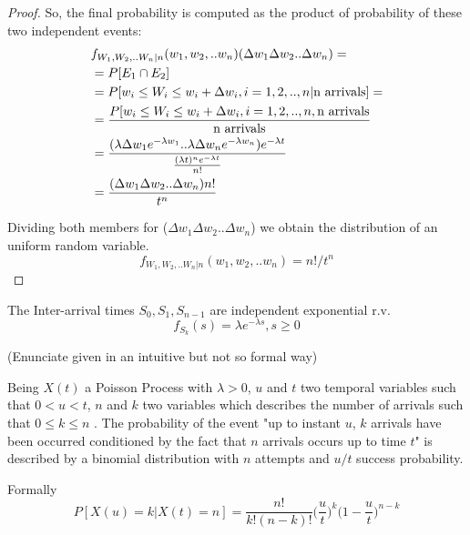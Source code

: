 \begin{theorem}
\begin{proof}
		So, the final probability is computed as the product of probability of these two independent events:
		\begin{equation}
			\begin{split}
				& f_{W_1,W_2,..W_n|n} (w_1,w_2,..w_n)( \Delta w_1\Delta w_2..\Delta w_n) = \\
				& =P[E_1 \cap E_2 ]\\
				& =P[w_i\leq W_i \leq w_i+\Delta w_i, i=1,2,..,n| \textnormal{n arrivals}]=\\
				& =\frac{P[w_i\leq W_i \leq w_i+\Delta w_i, i=1,2,..,n,\textnormal{n arrivals}}{\textnormal{n arrivals}}\\
				& =\frac{(\lambda \Delta w_1 e^{-\lambda w_1}..\lambda \Delta w_n e^{-\lambda w_n})e^{-\lambda t}}{\frac{(\lambda t)^{n}e^{-\lambda t}} {n!}}\\
				& =\frac{ (\Delta w_1 \Delta w_2.. \Delta w_n) n!}{t^n}
			\end{split}
		\end{equation}

		Dividing both members for ($\Delta w_1 \Delta w_2 .. \Delta w_n$) we obtain the distribution of an uniform random variable.
		\begin{equation}
			f_{W_1,W_2,..W_n|n} (w_1,w_2,..w_n) =n!/t^n
		\end{equation}
	\end{proof}
\end{theorem}

\begin{theorem}
	The Inter-arrival times $S_0,S_1, S_{n-1}$ are independent exponential r.v.
	\begin{equation}
		f_{S_k}(s)=\lambda e^{-\lambda s}, s \ge 0
	\end{equation}
\end{theorem}

\begin{theorem}
	(Enunciate given in an intuitive but not so formal way)

	Being $X(t)$ a Poisson Process with $\lambda>0$, $u$ and $t$ two temporal variables such that $0<u<t$, $n$ and $k$ two variables which describes the number of arrivals such that $0\leq k\leq n$ . The probability of the event "up to instant $u$, $k$ arrivals have been occurred conditioned by the fact that $n$ arrivals occurs up to time $t$" is described by a binomial distribution with $n$ attempts and $u/t$ success probability.

	Formally
	\begin{equation}
		P[X(u)=k|X(t)=n]= \frac{n!}{k!(n-k)!}\bigg(\frac{u}{t}\bigg)^k\bigg(1-\frac{u}{t}\bigg)^{n-k}
	\end{equation}
\end{theorem}

